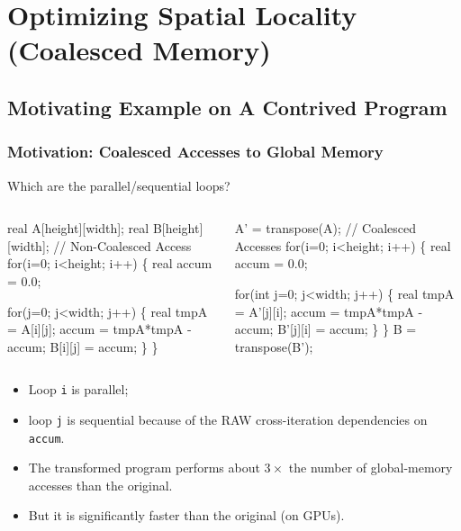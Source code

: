 \documentclass{beamer}
\renewcommand{\emph}[1]{\textcolor{CosGreen}{ #1}}
\newcommand{\emp}[1]{\textcolor{DikuRed}{ #1}}
\begin{document}

\section{Optimizing Spatial Locality (Coalesced Memory)}

\begin{frame}[fragile]
	\tableofcontents[currentsection]
\end{frame}

\subsection{Motivating Example on A Contrived Program}

\begin{frame}[fragile,t]
  \frametitle{Motivation: Coalesced Accesses to Global Memory} 

Which are the parallel/sequential loops?

\begin{columns}
\begin{colorcode}[fontsize=\scriptsize]
real A[height][width];
real B[height][width];
// Non-Coalesced Access
\emph{for(i=0; i<height; i++) \{}
  real accum  = 0.0;

  \emp{for(j=0; j<width; j++) \{}
    real tmpA = A[i][j];
    accum = tmpA*tmpA - accum;
    B[i][j] = accum;
  \}
\}\pause
\end{colorcode}
\begin{colorcode}[fontsize=\scriptsize]
A' = transpose(A);
// Coalesced Accesses
\emph{for(i=0; i<height; i++) \{}
  real accum = 0.0;

  \emp{for(int j=0; j<width; j++) \{}
    real tmpA = A'[j][i];
    accum = tmpA*tmpA - accum;
    B'[j][i] = accum;
  \}
\}
B = transpose(B');
\end{colorcode}
\end{columns}
\bigskip

\begin{itemize}
    \item \emph{Loop {\tt i} is parallel;}\smallskip
    \item \emp{loop {\tt j} is sequential} because 
            of the RAW cross-iteration dependencies on {\tt accum}.\bigskip
    \item The transformed program performs about $3\times$ the number
            of global-memory accesses than the original. \pause\smallskip
    \item But it is significantly faster than the original (on GPUs).
\end{itemize}

\end{frame}
\end{document}
